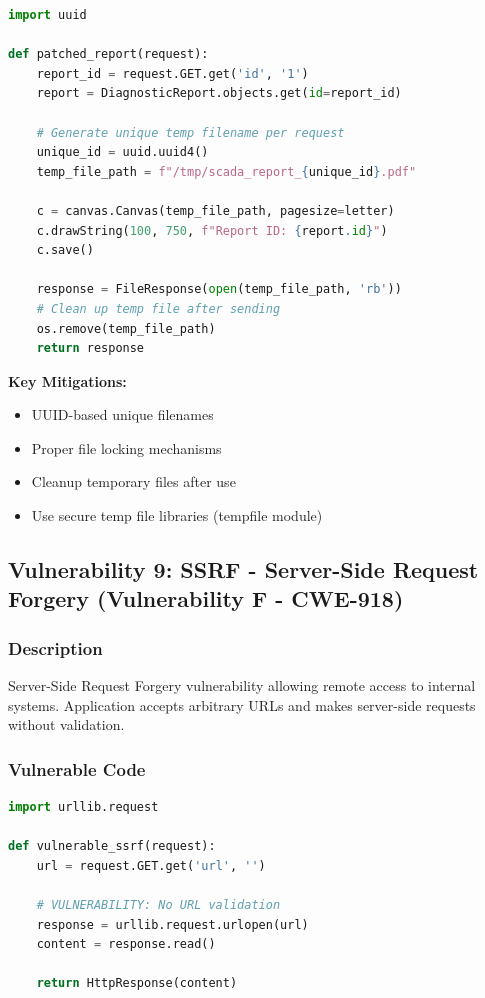 \documentclass[12pt,a4paper]{article}
\begin{document}
\begin{lstlisting}[language=Python]
import uuid

def patched_report(request):
    report_id = request.GET.get('id', '1')
    report = DiagnosticReport.objects.get(id=report_id)
    
    # Generate unique temp filename per request
    unique_id = uuid.uuid4()
    temp_file_path = f"/tmp/scada_report_{unique_id}.pdf"
    
    c = canvas.Canvas(temp_file_path, pagesize=letter)
    c.drawString(100, 750, f"Report ID: {report.id}")
    c.save()
    
    response = FileResponse(open(temp_file_path, 'rb'))
    # Clean up temp file after sending
    os.remove(temp_file_path)
    return response
\end{lstlisting}

\textbf{Key Mitigations:}
\begin{itemize}[leftmargin=*]
    \item UUID-based unique filenames
    \item Proper file locking mechanisms
    \item Cleanup temporary files after use
    \item Use secure temp file libraries (tempfile module)
\end{itemize}\subsection{Vulnerability 9: SSRF - Server-Side Request Forgery (Vulnerability F - CWE-918)}

\subsubsection{Description}
Server-Side Request Forgery vulnerability allowing remote access to internal systems. Application accepts arbitrary URLs and makes server-side requests without validation.

\subsubsection{Vulnerable Code}

\begin{lstlisting}[language=Python]
import urllib.request

def vulnerable_ssrf(request):
    url = request.GET.get('url', '')
    
    # VULNERABILITY: No URL validation
    response = urllib.request.urlopen(url)
    content = response.read()
    
    return HttpResponse(content)
\end{lstlisting}
\end{document}
